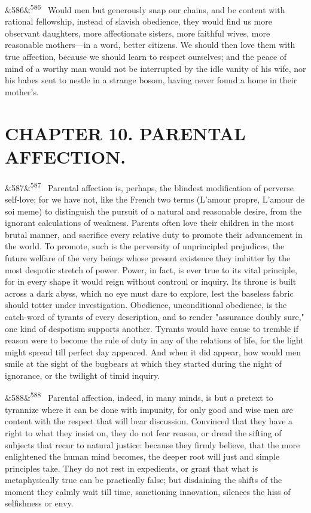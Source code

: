 \documentclass[12pt]{article}
\newcommand{\para}[1][]{\par\noindent\ifx&#1&\else\textsuperscript{\footnotesize #1}~\fi}
\begin{document}
\para[586] Would men but generously snap our chains, and be content with rational fellowship, instead of slavish obedience, they would find us more observant daughters, more affectionate sisters, more faithful wives, more reasonable mothers---in a word, better citizens. We should then love them with true affection, because we should learn to respect ourselves; and the peace of mind of a worthy man would not be interrupted by the idle vanity of his wife, nor his babes sent to nestle in a strange bosom, having never found a home in their mother's.

\section*{CHAPTER 10. PARENTAL AFFECTION.}

\para[587] Parental affection is, perhaps, the blindest modification of perverse self-love; for we have not, like the French two terms (L'amour propre, L'amour de soi meme) to distinguish the pursuit of a natural and reasonable desire, from the ignorant calculations of weakness. Parents often love their children in the most brutal manner, and sacrifice every relative duty to promote their advancement in the world. To promote, such is the perversity of unprincipled prejudices, the future welfare of the very beings whose present existence they imbitter by the most despotic stretch of power. Power, in fact, is ever true to its vital principle, for in every shape it would reign without controul or inquiry. Its throne is built across a dark abyss, which no eye must dare to explore, lest the baseless fabric should totter under investigation. Obedience, unconditional obedience, is the catch-word of tyrants of every description, and to render "assurance doubly sure," one kind of despotism supports another. Tyrants would have cause to tremble if reason were to become the rule of duty in any of the relations of life, for the light might spread till perfect day appeared. And when it did appear, how would men smile at the sight of the bugbears at which they started during the night of ignorance, or the twilight of timid inquiry.

\para[588] Parental affection, indeed, in many minds, is but a pretext to tyrannize where it can be done with impunity, for only good and wise men are content with the respect that will bear discussion. Convinced that they have a right to what they insist on, they do not fear reason, or dread the sifting of subjects that recur to natural justice: because they firmly believe, that the more enlightened the human mind becomes, the deeper root will just and simple principles take. They do not rest in expedients, or grant that what is metaphysically true can be practically false; but disdaining the shifts of the moment they calmly wait till time, sanctioning innovation, silences the hiss of selfishness or envy.
\end{document}
